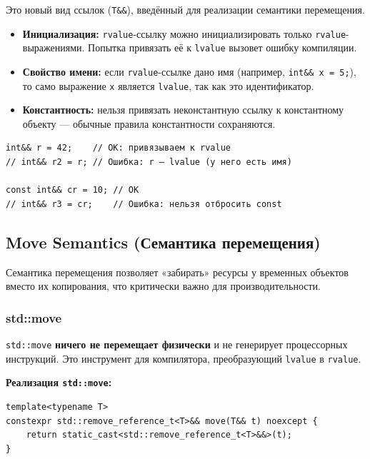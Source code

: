 \documentclass[a4paper,12pt]{article}
\begin{document}
Это новый вид ссылок (\texttt{T\&\&}), введённый для реализации семантики перемещения.

\begin{itemize}
  \item \textbf{Инициализация:} \texttt{rvalue}-ссылку можно инициализировать только
        \texttt{rvalue}-выражениями. Попытка привязать её к \texttt{lvalue} вызовет
        ошибку компиляции.
  \item \textbf{Свойство имени:} если \texttt{rvalue}-ссылке дано имя (например,
        \texttt{int\&\& x = 5;}), то само выражение \texttt{x} является
        \texttt{lvalue}, так как это идентификатор.
  \item \textbf{Константность:} нельзя привязать неконстантную ссылку к константному
        объекту --- обычные правила константности сохраняются.
\end{itemize}

\begin{lstlisting}
int&& r = 42;    // OK: привязываем к rvalue
// int&& r2 = r; // Ошибка: r — lvalue (у него есть имя)

const int&& cr = 10; // OK
// int&& r3 = cr;    // Ошибка: нельзя отбросить const
\end{lstlisting}

\subsection{Move Semantics (Семантика перемещения)}

Семантика перемещения позволяет «забирать» ресурсы у временных объектов вместо их
копирования, что критически важно для производительности.

\subsubsection{std::move}

\texttt{std::move} \textbf{ничего не перемещает физически} и не генерирует процессорных
инструкций. Это инструмент для компилятора, преобразующий \texttt{lvalue} в
\texttt{rvalue}.

\textbf{Реализация \texttt{std::move}:}

\begin{lstlisting}
template<typename T>
constexpr std::remove_reference_t<T>&& move(T&& t) noexcept {
    return static_cast<std::remove_reference_t<T>&&>(t);
}
\end{lstlisting}
\end{document}
